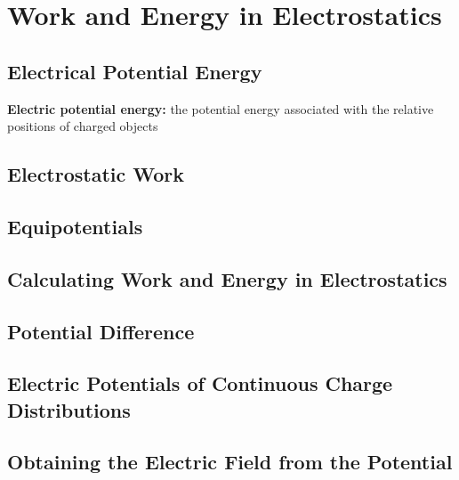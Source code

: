 \section{Work and Energy in Electrostatics}

    \subsection{Electrical Potential Energy}    %

        \textbf{Electric potential energy:} the potential energy associated with the relative positions of charged objects

    \subsection{Electrostatic Work}     %
    \subsection{Equipotentials}     %
    \subsection{Calculating Work and Energy in Electrostatics}      %
    \subsection{Potential Difference}       %
    \subsection{Electric Potentials of Continuous Charge Distributions}   %
    \subsection{Obtaining the Electric Field from the Potential}    %